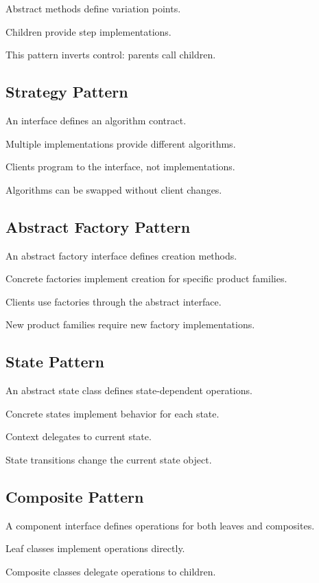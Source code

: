 \documentclass[11pt]{article}
\begin{document}
Abstract methods define variation points.

Children provide step implementations.

This pattern inverts control: parents call children.

\subsection{Strategy Pattern}

An interface defines an algorithm contract.

Multiple implementations provide different algorithms.

Clients program to the interface, not implementations.

Algorithms can be swapped without client changes.

\subsection{Abstract Factory Pattern}

An abstract factory interface defines creation methods.

Concrete factories implement creation for specific product families.

Clients use factories through the abstract interface.

New product families require new factory implementations.

\subsection{State Pattern}

An abstract state class defines state-dependent operations.

Concrete states implement behavior for each state.

Context delegates to current state.

State transitions change the current state object.

\subsection{Composite Pattern}

A component interface defines operations for both leaves and composites.

Leaf classes implement operations directly.

Composite classes delegate operations to children.
\end{document}
